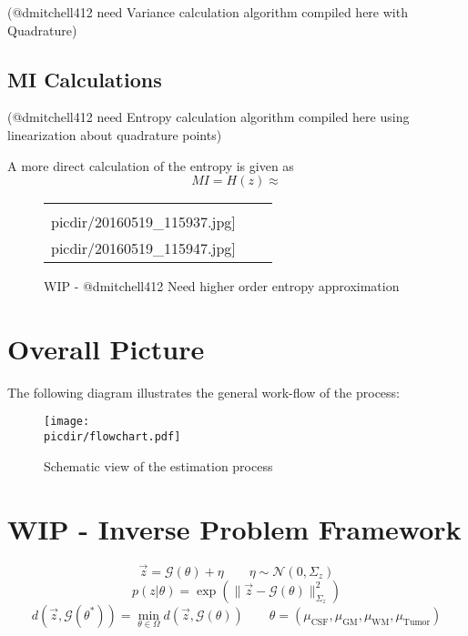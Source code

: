 \documentclass{article}         %
\theoremstyle{definition}
\theoremstyle{remark}
\newcommand{\picdir}{pdffig/}
\begin{document}


{\color{red}(@dmitchell412 need Variance calculation algorithm compiled here with Quadrature)}

\subsection{MI Calculations}

{\color{red}(@dmitchell412 need Entropy calculation algorithm compiled here using
linearization about quadrature points)}

A more direct calculation of the entropy is given as
\[
 MI = H(z) \approx 
\]

\begin{figure}[h] 
\centering
\begin{tabular}{ccc}
\texttt{[image: \\picdir/20160519\_115937.jpg]} & 
\texttt{[image: \\picdir/20160519\_115947.jpg]} \\
\end{tabular}
\caption{ 
\color{red}
WIP - @dmitchell412 Need higher order entropy approximation
}\label{fig:Pulsesequence}
\end{figure}


\section{Overall Picture}
The following diagram illustrates the general work-flow of the process:
\begin{figure}[h!!]
\center
\texttt{[image: \\picdir/flowchart.pdf]}
\caption{Schematic view of the estimation process}
\end{figure}

\section{WIP - Inverse Problem Framework}\label{InverseProbFramework}
\[
  \vec{z}  = \mathcal{G}(\theta) + \eta   \qquad   \eta \sim \mathcal{N}(0,\Sigma_z)
\]
\[
  p(z|\theta ) = \exp \left( \|\vec{z} -  \mathcal{G}(\theta)\|^2_{\Sigma_z} \right)
\]
\[
               d\left(\vec{z}, \mathcal{G}(\theta^*)\right) = 
   \min_{\theta \in \Omega} d\left(\vec{z}, \mathcal{G}(\theta)\right)
\qquad
\theta = \left(\mu_\text{CSF}, \mu_\text{GM}, \mu_\text{WM}, \mu_\text{Tumor} \right)
\]
\end{document}
